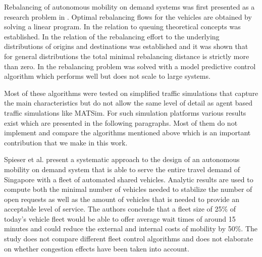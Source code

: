 Rebalancing of autonomous mobility on demand systems was first presented as a research
 problem in \citep{pavone2011load}. Optimal rebalancing flows for the vehicles are
 obtained by solving a linear program. In \citep{zhang2016control} the relation to
 queuing theoretical concepts was established. In \citep{treleaven2011asymptotically}
 the relation of the rebalancing effort to the underlying distributions of origins
 and destinations was established and it was shown that for general distributions
 the total minimal rebalancing distance is strictly more than zero.
 In   \citep{zhang2016model} the rebalancing problem was solved with a model
 predictive control algorithm which performs well but does not scale to large systems.

Most of these algorithms were tested on simplified traffic simulations that capture
the main characteristics but do not allow the same level of detail as agent based
traffic simulations like MATSim. For such simulation platforms various results
exist which are presented in the following paragraphs. Most of them do not
implement and compare the algorithms mentioned above which is an important
contribution that we make in this work.

Spieser et al. \cite{spieser2014toward} present a systematic approach to the
design of an autonomous mobility on demand system that is able to serve the entire
travel demand of Singapore with a fleet of automated shared vehicles. Analytic
results are used to compute both the minimal number of vehicles needed to stabilize
the number of open requests as well as the amount of vehicles that is needed to
provide an acceptable level of service. The authors conclude that a fleet size
of 25\% of today's vehicle fleet would be able to offer average wait times of
around 15 minutes and could reduce the external and internal costs of mobility by 50\%.
The study does not compare different fleet control algorithms and does not
elaborate on whether congestion effects have been taken into account.

